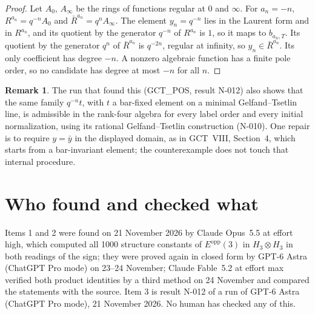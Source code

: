 \documentclass[11pt,a4paper]{article}
\theoremstyle{definition}
\newtheorem{remark}{Remark}
\begin{document}
\begin{proof}
Let $A_0$, $A_\infty$ be the rings of functions regular at $0$ and $\infty$.
For $a_n=-n$, $R^{a_n}=q^{-n}A_0$ and $\bar R^{a_n}=q^nA_\infty$. The element
$y_n=q^{-n}$ lies in the Laurent form and in $R^{a_n}$, and its quotient by the
generator $q^{-n}$ of $R^{a_n}$ is $1$, so it maps to $b_{a_n,T}$. Its quotient
by the generator $q^n$ of $\bar R^{a_n}$ is $q^{-2n}$, regular at infinity, so
$y_n\in\bar R^{a_n}$. Its only coefficient has degree $-n$. A nonzero algebraic
function has a finite pole order, so no candidate has degree at most $-n$ for
all $n$.
\end{proof}

\begin{remark}
The run that found this (GCT\_POS, result N-012) also shows that the same family
$q^{-n}t$, with $t$ a bar-fixed element on a minimal Gelfand--Tsetlin line, is
admissible in the rank-four algebra for every label order and every initial
normalization, using its rational Gelfand--Tsetlin construction (N-010). One
repair is to require $y=\bar y$ in the displayed domain, as in GCT~VIII,
Section~4, which starts from a bar-invariant element; the counterexample does
not touch that internal procedure.
\end{remark}

\section*{Who found and checked what}
Items 1 and 2 were found on 21 November 2026 by Claude Opus~5.5 at effort high,
which computed all 1000 structure constants of $E^{\mathrm{opp}}(3)$ in
$H_3\otimes H_3$ in both readings of the sign; they were proved again in closed
form by GPT-6 Astra (ChatGPT Pro mode) on 23--24 November; Claude Fable~5.2 at
effort max verified both product identities by a third method on 24 November and
compared the statements with the source. Item 3 is result N-012 of a run of
GPT-6 Astra (ChatGPT Pro mode), 21 November 2026. No human has checked any of
this.
\end{document}
